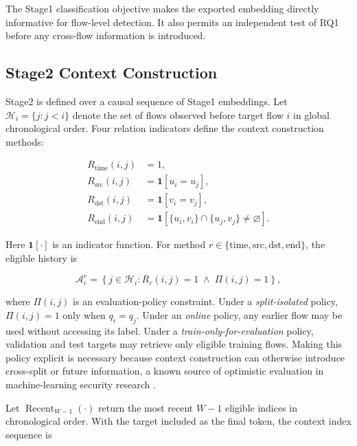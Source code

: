 The Stage1 classification objective makes the exported embedding directly
informative for flow-level detection. It also permits an independent test of
RQ1 before any cross-flow information is introduced.

\subsection{Stage2 Context Construction}
\label{subsec:pf_context}

Stage2 is defined over a causal sequence of Stage1 embeddings. Let
$\mathcal{H}_i=\{j: j<i\}$ denote the set of flows observed before target flow
$i$ in global chronological order. Four relation indicators define the context
construction methods:

\begin{align}
R_{\mathrm{time}}(i,j)
&=1,
\label{eq:relation_time}\\
R_{\mathrm{src}}(i,j)
&=\mathbf{1}[u_i=u_j],
\label{eq:relation_source}\\
R_{\mathrm{dst}}(i,j)
&=\mathbf{1}[v_i=v_j],
\label{eq:relation_destination}\\
R_{\mathrm{end}}(i,j)
&=\mathbf{1}
\left[
\{u_i,v_i\}\cap\{u_j,v_j\}\neq\varnothing
\right].
\label{eq:relation_endpoint}
\end{align}

Here $\mathbf{1}[\cdot]$ is an indicator function. For method
$r\in\{\mathrm{time},\mathrm{src},\mathrm{dst},\mathrm{end}\}$, the eligible
history is

\begin{equation}
\mathcal{A}_{i}^{r}
=
\left\{
j\in\mathcal{H}_i:
R_{r}(i,j)=1
\;\land\;
\Pi(i,j)=1
\right\},
\label{eq:eligible_context}
\end{equation}

where $\Pi(i,j)$ is an evaluation-policy constraint. Under a
\emph{split-isolated} policy, $\Pi(i,j)=1$ only when $q_i=q_j$. Under an
\emph{online} policy, any earlier flow may be used without accessing its label.
Under a \emph{train-only-for-evaluation} policy, validation and test targets may
retrieve only eligible training flows. Making this policy explicit is necessary
because context construction can otherwise introduce cross-split or future
information, a known source of optimistic evaluation in machine-learning
security research \cite{Arp2022DosDonts}.

Let $\operatorname{Recent}_{W-1}(\cdot)$ return the most recent $W-1$ eligible
indices in chronological order. With the target included as the final token,
the context index sequence is

